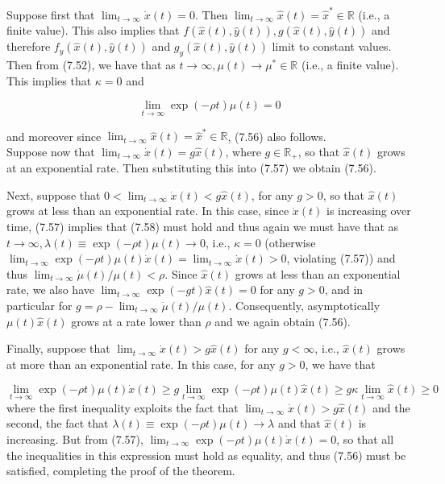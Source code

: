 \documentclass[\topdir/lecture_notes.tex]{subfiles}
\begin{document}
Suppose first that $\lim _{t \rightarrow \infty} \dot{x}(t)=0$. Then $\lim _{t \rightarrow \infty} \hat{x}(t)=\hat{x}^{*} \in \mathbb{R}$ (i.e., a finite value). This also implies that $f(\hat{x}(t), \hat{y}(t)), g(\hat{x}(t), \hat{y}(t))$ and therefore $f_{y}(\hat{x}(t), \hat{y}(t))$ and $g_{y}(\hat{x}(t), \hat{y}(t))$ limit to constant values. Then from (7.52), we have that as $t \rightarrow \infty, \mu(t) \rightarrow \mu^{*} \in \mathbb{R}$ (i.e., a finite value). This implies that $\kappa=0$ and

\[
\lim _{t \rightarrow \infty} \exp (-\rho t) \mu(t)=0
\]

and moreover since $\lim _{t \rightarrow \infty} \hat{x}(t)=\hat{x}^{*} \in \mathbb{R}$, (7.56) also follows.\\
Suppose now that $\lim _{t \rightarrow \infty} \dot{x}(t)=g \hat{x}(t)$, where $g \in \mathbb{R}_{+}$, so that $\hat{x}(t)$ grows at an exponential rate. Then substituting this into (7.57) we obtain (7.56).

Next, suppose that $0<\lim _{t \rightarrow \infty} \dot{x}(t)<g \hat{x}(t)$, for any $g>0$, so that $\hat{x}(t)$ grows at less than an exponential rate. In this case, since $\dot{x}(t)$ is increasing over time, (7.57) implies that (7.58) must hold and thus again we must have that as $t \rightarrow \infty, \lambda(t) \equiv \exp (-\rho t) \mu(t) \rightarrow 0$, i.e., $\kappa=0$ (otherwise $\lim _{t \rightarrow \infty} \exp (-\rho t) \mu(t) \dot{x}(t)=\lim _{t \rightarrow \infty} \dot{x}(t)>0$, violating (7.57)) and thus $\lim _{t \rightarrow \infty} \dot{\mu}(t) / \mu(t)<\rho$. Since $\hat{x}(t)$ grows at less than an exponential rate, we also have $\lim _{t \rightarrow \infty} \exp (-g t) \hat{x}(t)=0$ for any $g>0$, and in particular for $g=\rho-\lim _{t \rightarrow \infty} \dot{\mu}(t) / \mu(t)$. Consequently, asymptotically $\mu(t) \hat{x}(t)$ grows at a rate lower than $\rho$ and we again obtain (7.56).

Finally, suppose that $\lim _{t \rightarrow \infty} \dot{x}(t)>g \hat{x}(t)$ for any $g<\infty$, i.e., $\hat{x}(t)$ grows at more than an exponential rate. In this case, for any $g>0$, we have that

\[
\lim _{t \rightarrow \infty} \exp (-\rho t) \mu(t) \dot{x}(t) \geq g \lim _{t \rightarrow \infty} \exp (-\rho t) \mu(t) \hat{x}(t) \geq g \kappa \lim _{t \rightarrow \infty} \hat{x}(t) \geq 0
\]
where the first inequality exploits the fact that $\lim _{t \rightarrow \infty} \dot{x}(t)>g \hat{x}(t)$ and the second, the fact that $\lambda(t) \equiv \exp (-\rho t) \mu(t) \rightarrow \lambda$ and that $\hat{x}(t)$ is increasing. But from (7.57), $\lim _{t \rightarrow \infty} \exp (-\rho t) \mu(t) \dot{x}(t)=0$, so that all the inequalities in this expression must hold as equality, and thus (7.56) must be satisfied, completing the proof of the theorem.
\end{document}
